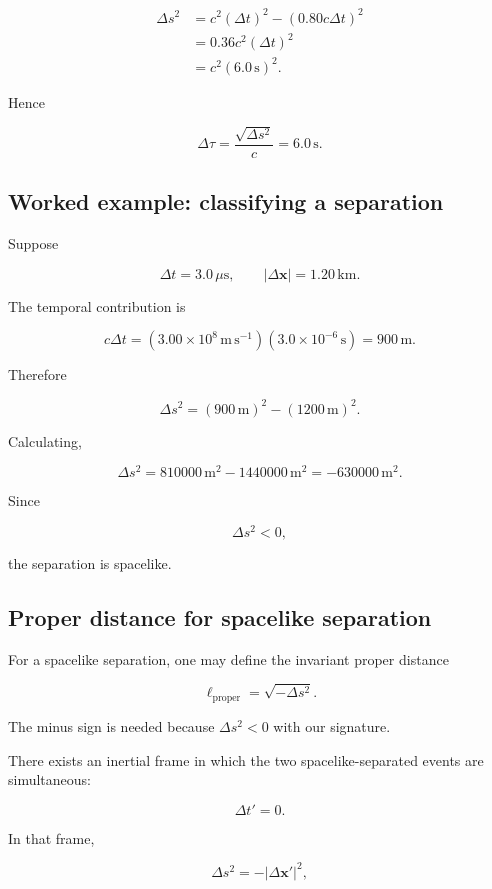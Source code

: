 \[
\begin{aligned}
\Delta s^{2}
&=
c^{2}(\Delta t)^{2}
-(0.80c\Delta t)^{2}\\
&=
0.36c^{2}(\Delta t)^{2}\\
&=
c^{2}(6.0\,\mathrm{s})^{2}.
\end{aligned}
\]

Hence

\[
\Delta\tau=\frac{\sqrt{\Delta s^{2}}}{c}=6.0\,\mathrm{s}.
\]

\subsection{Worked example: classifying a separation}

Suppose

\[
\Delta t=3.0\,\mu\mathrm{s},
\qquad
|\Delta\mathbf{x}|=1.20\,\mathrm{km}.
\]

The temporal contribution is

\[
c\Delta t
=
(3.00\times10^{8}\,\mathrm{m\,s^{-1}})
(3.0\times10^{-6}\,\mathrm{s})
=
900\,\mathrm{m}.
\]

Therefore

\[
\Delta s^{2}
=
(900\,\mathrm{m})^{2}
-(1200\,\mathrm{m})^{2}.
\]

Calculating,

\[
\Delta s^{2}
=
810000\,\mathrm{m}^{2}
-
1440000\,\mathrm{m}^{2}
=
-630000\,\mathrm{m}^{2}.
\]

Since

\[
\Delta s^{2}<0,
\]

the separation is spacelike.

\subsection{Proper distance for spacelike separation}

For a spacelike separation, one may define the invariant proper distance

\[
\boxed{
\ell_{\mathrm{proper}}
=
\sqrt{-\Delta s^{2}}
}.
\]

The minus sign is needed because \(\Delta s^{2}<0\) with our signature.

There exists an inertial frame in which the two spacelike-separated events are simultaneous:

\[
\Delta t'=0.
\]

In that frame,

\[
\Delta s^{2}
=
-|\Delta\mathbf{x}'|^{2},
\]

